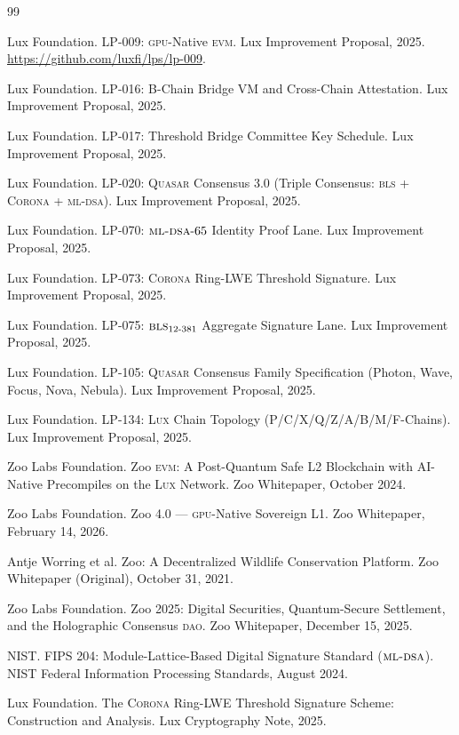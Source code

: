 \documentclass[11pt,letterpaper]{article}
\newcommand{\Lux}{\textsc{Lux}}
\newcommand{\Quasar}{\textsc{Quasar}}
\newcommand{\GPU}{\textsc{gpu}}
\newcommand{\DAO}{\textsc{dao}}
\newcommand{\BLS}{\textsc{bls}}
\newcommand{\MLDSA}{\textsc{ml-dsa}}
\newcommand{\Corona}{\textsc{Corona}}
\begin{document}
\begin{thebibliography}{99}

Lux Foundation.
\newblock LP-009: \GPU{}-Native \textsc{evm}.
\newblock Lux Improvement Proposal, 2025.
\newblock \url{https://github.com/luxfi/lps/lp-009}.

Lux Foundation.
\newblock LP-016: B-Chain Bridge VM and Cross-Chain Attestation.
\newblock Lux Improvement Proposal, 2025.

Lux Foundation.
\newblock LP-017: Threshold Bridge Committee Key Schedule.
\newblock Lux Improvement Proposal, 2025.

Lux Foundation.
\newblock LP-020: \Quasar{} Consensus 3.0 (Triple Consensus: \BLS{} + \Corona{} + \MLDSA{}).
\newblock Lux Improvement Proposal, 2025.

Lux Foundation.
\newblock LP-070: $\MLDSA{}\text{-}65$ Identity Proof Lane.
\newblock Lux Improvement Proposal, 2025.

Lux Foundation.
\newblock LP-073: \Corona{} Ring-LWE Threshold Signature.
\newblock Lux Improvement Proposal, 2025.

Lux Foundation.
\newblock LP-075: $\BLS{}_{12\text{-}381}$ Aggregate Signature Lane.
\newblock Lux Improvement Proposal, 2025.

Lux Foundation.
\newblock LP-105: \Quasar{} Consensus Family Specification (Photon, Wave, Focus, Nova, Nebula).
\newblock Lux Improvement Proposal, 2025.

Lux Foundation.
\newblock LP-134: \Lux{} Chain Topology (P/C/X/Q/Z/A/B/M/F-Chains).
\newblock Lux Improvement Proposal, 2025.

Zoo Labs Foundation.
\newblock Zoo \textsc{evm}: A Post-Quantum Safe L2 Blockchain with AI-Native Precompiles on the \Lux{} Network.
\newblock Zoo Whitepaper, October 2024.

Zoo Labs Foundation.
\newblock Zoo 4.0 --- \GPU{}-Native Sovereign L1.
\newblock Zoo Whitepaper, February 14, 2026.

Antje Worring et al.
\newblock Zoo: A Decentralized Wildlife Conservation Platform.
\newblock Zoo Whitepaper (Original), October 31, 2021.

Zoo Labs Foundation.
\newblock Zoo 2025: Digital Securities, Quantum-Secure Settlement, and the Holographic Consensus \DAO{}.
\newblock Zoo Whitepaper, December 15, 2025.

NIST.
\newblock FIPS 204: Module-Lattice-Based Digital Signature Standard ($\MLDSA{}$).
\newblock NIST Federal Information Processing Standards, August 2024.

Lux Foundation.
\newblock The \Corona{} Ring-LWE Threshold Signature Scheme: Construction and Analysis.
\newblock Lux Cryptography Note, 2025.

\end{thebibliography}
\end{document}
